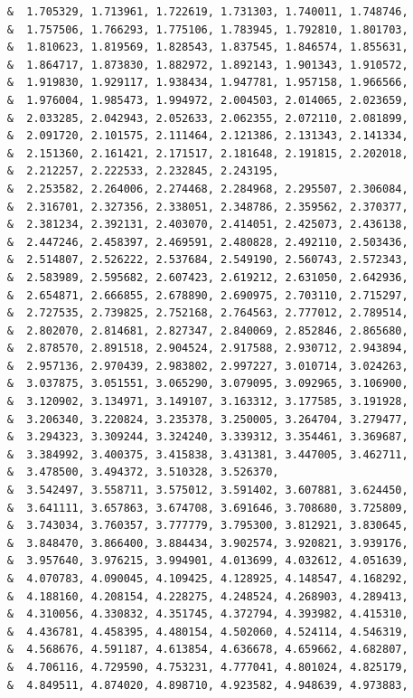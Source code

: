 \begin{lstlisting}
     &  1.705329, 1.713961, 1.722619, 1.731303, 1.740011, 1.748746,
     &  1.757506, 1.766293, 1.775106, 1.783945, 1.792810, 1.801703,
     &  1.810623, 1.819569, 1.828543, 1.837545, 1.846574, 1.855631,
     &  1.864717, 1.873830, 1.882972, 1.892143, 1.901343, 1.910572,
     &  1.919830, 1.929117, 1.938434, 1.947781, 1.957158, 1.966566,
     &  1.976004, 1.985473, 1.994972, 2.004503, 2.014065, 2.023659,
     &  2.033285, 2.042943, 2.052633, 2.062355, 2.072110, 2.081899,
     &  2.091720, 2.101575, 2.111464, 2.121386, 2.131343, 2.141334,
     &  2.151360, 2.161421, 2.171517, 2.181648, 2.191815, 2.202018,
     &  2.212257, 2.222533, 2.232845, 2.243195,
     &  2.253582, 2.264006, 2.274468, 2.284968, 2.295507, 2.306084,
     &  2.316701, 2.327356, 2.338051, 2.348786, 2.359562, 2.370377,
     &  2.381234, 2.392131, 2.403070, 2.414051, 2.425073, 2.436138,
     &  2.447246, 2.458397, 2.469591, 2.480828, 2.492110, 2.503436,
     &  2.514807, 2.526222, 2.537684, 2.549190, 2.560743, 2.572343,
     &  2.583989, 2.595682, 2.607423, 2.619212, 2.631050, 2.642936,
     &  2.654871, 2.666855, 2.678890, 2.690975, 2.703110, 2.715297,
     &  2.727535, 2.739825, 2.752168, 2.764563, 2.777012, 2.789514,
     &  2.802070, 2.814681, 2.827347, 2.840069, 2.852846, 2.865680,
     &  2.878570, 2.891518, 2.904524, 2.917588, 2.930712, 2.943894,
     &  2.957136, 2.970439, 2.983802, 2.997227, 3.010714, 3.024263,
     &  3.037875, 3.051551, 3.065290, 3.079095, 3.092965, 3.106900,
     &  3.120902, 3.134971, 3.149107, 3.163312, 3.177585, 3.191928,
     &  3.206340, 3.220824, 3.235378, 3.250005, 3.264704, 3.279477,
     &  3.294323, 3.309244, 3.324240, 3.339312, 3.354461, 3.369687,
     &  3.384992, 3.400375, 3.415838, 3.431381, 3.447005, 3.462711,
     &  3.478500, 3.494372, 3.510328, 3.526370,
     &  3.542497, 3.558711, 3.575012, 3.591402, 3.607881, 3.624450,
     &  3.641111, 3.657863, 3.674708, 3.691646, 3.708680, 3.725809,
     &  3.743034, 3.760357, 3.777779, 3.795300, 3.812921, 3.830645,
     &  3.848470, 3.866400, 3.884434, 3.902574, 3.920821, 3.939176,
     &  3.957640, 3.976215, 3.994901, 4.013699, 4.032612, 4.051639,
     &  4.070783, 4.090045, 4.109425, 4.128925, 4.148547, 4.168292,
     &  4.188160, 4.208154, 4.228275, 4.248524, 4.268903, 4.289413,
     &  4.310056, 4.330832, 4.351745, 4.372794, 4.393982, 4.415310,
     &  4.436781, 4.458395, 4.480154, 4.502060, 4.524114, 4.546319,
     &  4.568676, 4.591187, 4.613854, 4.636678, 4.659662, 4.682807,
     &  4.706116, 4.729590, 4.753231, 4.777041, 4.801024, 4.825179,
     &  4.849511, 4.874020, 4.898710, 4.923582, 4.948639, 4.973883,

\end{lstlisting}
